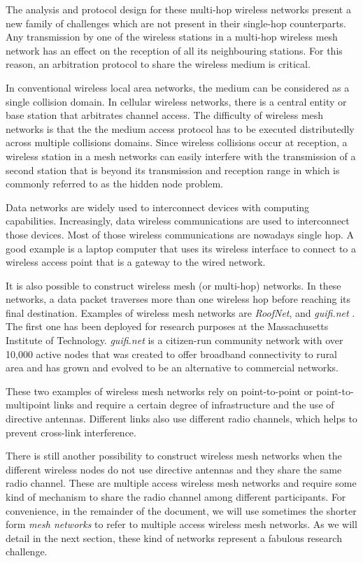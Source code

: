 \documentclass[a4paper,twocolumns]{article}%
\begin{document}
The analysis and protocol design for these multi-hop wireless networks present a new family of challenges which are not present in their single-hop counterparts.
Any transmission by one of the wireless stations in a multi-hop wireless mesh network has an effect on the reception of all its neighbouring stations.
For this reason, an arbitration protocol to share the wireless medium is critical.

In conventional wireless local area networks, the medium can be considered as a single collision domain.
In cellular wireless networks, there is a central entity or base station that arbitrates channel access.
The difficulty of wireless mesh networks is that the the medium access protocol has to be executed distributedly across multiple collisions domains.
Since wireless collisions occur at reception, a wireless station in a mesh networks can easily interfere with the transmission of a second station that is beyond its transmission and reception range in which is commonly referred to as the hidden node problem.

Data networks are widely used to interconnect devices with computing capabilities.
Increasingly, data wireless communications are used to interconnect those devices.
Most of those wireless communications are nowadays single hop.
A good example is a laptop computer that uses its wireless interface to connect to a wireless access point that is a gateway to the wired network.

It is also possible to construct wireless mesh (or multi-hop) networks.
In these networks, a data packet traverses more than one wireless hop before reaching its final destination.
Examples of wireless mesh networks are \emph{RoofNet}\cite{chambers2002grr}, and \emph{guifi.net} \cite{oliver2010wca}.
The first one has been deployed for research purposes at the Massachusetts Institute of Technology.
\emph{guifi.net} is a citizen-run community network with over 10,000 active nodes that was created to offer broadband connectivity to rural area and has grown and evolved to be an alternative to commercial networks.

These two examples of wireless mesh networks rely on point-to-point or point-to-multipoint links and require a certain degree of infrastructure and the use of directive antennas.
Different links also use different radio channels, which helps to prevent cross-link interference.

There is still another possibility to construct wireless mesh networks when the different wireless nodes do not use directive antennas and they share the same radio channel.
These are multiple access wireless mesh networks and require some kind of mechanism to share the radio channel among different participants.
For convenience, in the remainder of the document, we will use sometimes the shorter form \emph{mesh networks} to refer to multiple access wireless mesh networks.
As we will detail in the next section, these kind of networks represent a fabulous research challenge.
\end{document}
